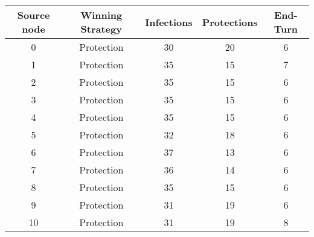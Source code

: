 \documentclass[results.tex]{subfiles}
\begin{document}
    \begin{center}
        \begin{tabular}{| c || c | c | c | c |}
            \hline
            {\bfseries Source node} & {\bfseries Winning Strategy} & {\bfseries Infections} & {\bfseries Protections}
            & {\bfseries End-Turn}
            \\  %
            \hline\hline
            0                       & Protection                   & 30                     & 20                      & 6                    \\
            \hline
            1                       & Protection                   & 35                     & 15                      & 7                    \\
            \hline
            2                       & Protection                   & 35                     & 15                      & 6                    \\
            \hline
            3                       & Protection                   & 35                     & 15                      & 6                    \\
            \hline
            4                       & Protection                   & 35                     & 15                      & 6                    \\
            \hline
            5                       & Protection                   & 32                     & 18                      & 6                    \\
            \hline
            6                       & Protection                   & 37                     & 13                      & 6                    \\
            \hline
            7                       & Protection                   & 36                     & 14                      & 6                    \\
            \hline
            8                       & Protection                   & 35                     & 15                      & 6                    \\
            \hline
            9                       & Protection                   & 31                     & 19                      & 6                    \\
            \hline
            10                      & Protection                   & 31                     & 19                      & 8                    \\

\end{tabular}
\end{center}
\end{document}
